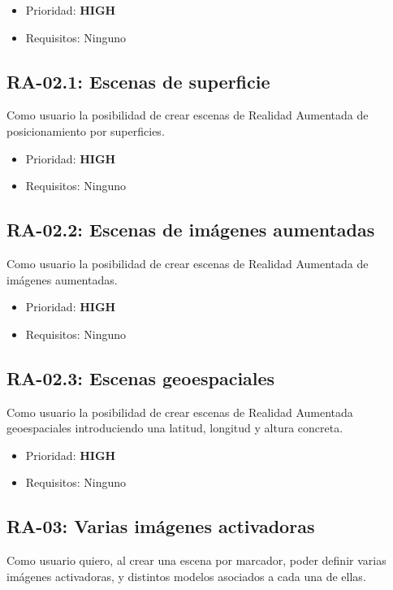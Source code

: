 \begin{itemize}
    \item Prioridad: \textbf{HIGH}
    \item Requisitos: Ninguno
\end{itemize}

\subsection{RA-02.1: Escenas de superficie}
Como usuario la posibilidad de crear escenas de Realidad Aumentada de posicionamiento por superficies.

\begin{itemize}
    \item Prioridad: \textbf{HIGH}
    \item Requisitos: Ninguno
\end{itemize}

\subsection{RA-02.2: Escenas de imágenes aumentadas}
Como usuario la posibilidad de crear escenas de Realidad Aumentada de imágenes aumentadas.

\begin{itemize}
    \item Prioridad: \textbf{HIGH}
    \item Requisitos: Ninguno
\end{itemize}

\subsection{RA-02.3: Escenas geoespaciales}
Como usuario la posibilidad de crear escenas de Realidad Aumentada geoespaciales introduciendo una latitud, longitud y altura concreta.

\begin{itemize}
    \item Prioridad: \textbf{HIGH}
    \item Requisitos: Ninguno
\end{itemize}

\subsection{RA-03: Varias imágenes activadoras}
Como usuario quiero, al crear una escena por marcador, poder definir varias imágenes activadoras, y distintos modelos asociados a cada una de ellas.

